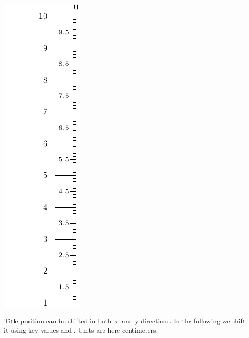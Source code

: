 \documentclass[a4paper,11pt,english]{sphinxmanual}
\begin{document}
\includegraphics{ex_axes_2.pdf}

Title position can be shifted in both x- and y-directions. In the following we shift it using key-values
 and . Units are here centimeters.
\end{document}
